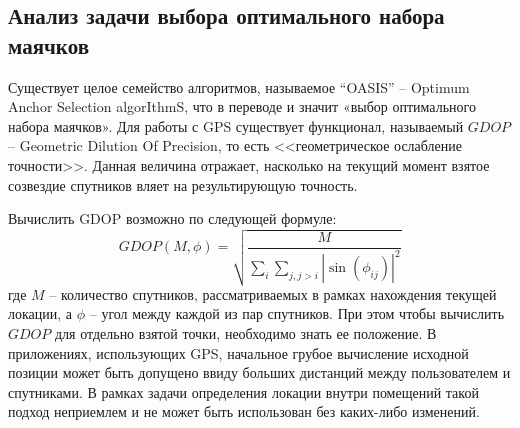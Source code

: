 \subsection{Анализ задачи выбора оптимального набора маячков}

Существует целое семейство алгоритмов, называемое “OASIS” – Opti\-mum Anchor Selection algorIthmS, что в переводе и значит «выбор оптимального набора маячков». Для работы с GPS существует функционал, называемый $GDOP$ – Geometric Dilution Of Precision, то есть <<геометрическое ослабление точности>>. Данная величина отражает, насколько на текущий момент взятое созвездие спутников вляет на результирующую точность.

Вычислить GDOP возможно по следующей формуле:
\begin{equation} \label{for:gdop}
    GDOP(M, \phi)=\sqrt{ \frac{M}{\sum_i\sum_{j,j>i}|\sin(\phi_{ij})|^2} }
\end{equation}
где $M$ – количество спутников, рассматриваемых в рамках нахождения текущей локации, а $\phi$ – угол между каждой из пар спутников. При этом чтобы вычислить $GDOP$ для отдельно взятой точки, необходимо знать ее положение. В приложениях, использующих GPS, начальное грубое вычисление исходной позиции может быть допущено ввиду больших дистанций между пользователем и спутниками. В рамках задачи определения локации внутри помещений такой подход неприемлем и не может быть использован без каких-либо изменений.

